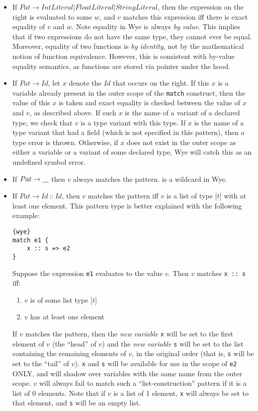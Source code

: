 \documentclass[a4paper, 12pt]{article}
\newcommand{\uscore}{\underline{\hspace{0.3cm}}}
\begin{document}
\begin{itemize}
\item If $Pat \to IntLiteral | FloatLiteral | StringLiteral$, then the expression on the right is evaluated to some $w$, and $v$ matches this expression iff there is exact equality of $v$ and $w$. Note equality in Wye is always \textit{by value}. This implies that if two expressions do not have the same type, they cannot ever be equal. Moreover, equality of two functions is \textit{by identity}, not by the mathematical notion of function equivalence. However, this is consistent with by-value equality semantics, as functions are stored via pointer under the hood.
\item If $Pat \to Id$, let $x$ denote the $Id$ that occurs on the right. If this $x$ is a variable already present in the outer scope of the \texttt{match} construct, then the value of this $x$ is taken and exact equality is checked between the value of $x$ and $v$, as described above. If such $x$ is the name of a variant of a declared type, we check that $v$ is a type variant with this type. If $x$ is the name of a type variant that had a field (which is not specified in this pattern), then a type error is thrown. Otherwise, if $x$ does not exist in the outer scope as either a variable or a variant of some declared type, Wye will catch this as an undefined symbol error.
\item If $Pat \to \uscore$ then $v$ always matches the pattern. \uscore{} is a wildcard in Wye.
\item If $Pat \to Id \:\texttt{::}\: Id$, then $v$ matches the pattern iff $v$ is a list of type $\texttt{[}t\texttt{]}$ with at least one element. This pattern type is better explained with the following example:
\begin{lstlisting}{wye}
match e1 {
	x :: s => e2
}
\end{lstlisting}
Suppose the expression \texttt{e1} evaluates to the value $v$. Then $v$ matches \texttt{x :: s} iff:
\begin{enumerate}
\item $v$ is of some list type $\texttt{[}t\texttt{]}$
\item $v$ has at least one element
\end{enumerate}
If $v$ matches the pattern, then the \textit{new variable} \texttt{x} will be set to the first element of $v$ (the ``head'' of $v$) and the \textit{new variable} \texttt{s} will be set to the list containing the remaining elements of $v$, in the original order (that is, \texttt{s} will be set to the ``tail'' of $v$). \texttt{x} and \texttt{s} will be available for use in the scope of \texttt{e2} ONLY, and will shadow over variables with the same name from the outer scope. $v$ will always fail to match such a ``list-construction'' pattern if it is a list of 0 elements. Note that if $v$ is a list of 1 element, \texttt{x} will always be set to that element, and \texttt{s} will be an empty list.

\end{itemize}
\end{document}
